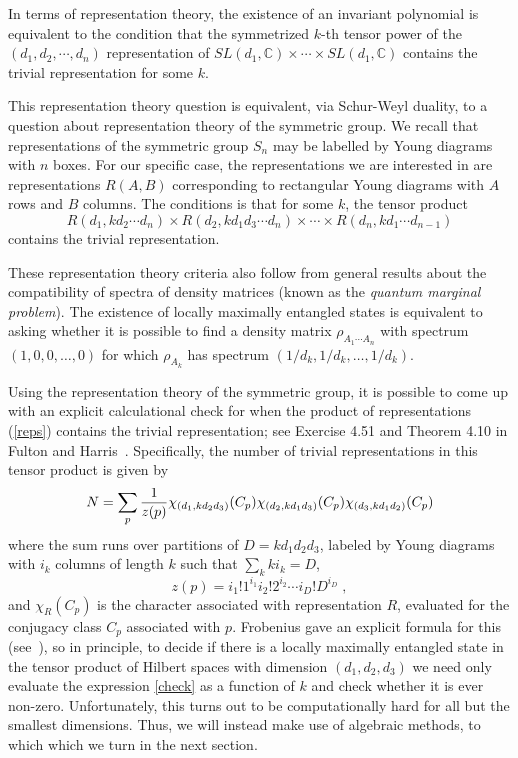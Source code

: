 \documentclass[12pt]{article}
\theoremstyle{definition}
\newcommand{\be}{\begin{equation}}
\newcommand{\ee}{\end{equation}}
\begin{document}
In terms of representation theory, the existence of an invariant polynomial is equivalent to the condition that the symmetrized $k$-th tensor power of the $(d_1,d_2,\cdots, d_n)$ representation of $SL(d_1, \mathbb{C}) \times \cdots \times SL(d_1, \mathbb{C})$ contains the trivial representation for some $k$.

This representation theory question is equivalent, via Schur-Weyl duality, to a question about representation theory of the symmetric group. We recall that representations of the symmetric group $S_n$ may be labelled by Young diagrams with $n$ boxes. For our specific case, the representations we are interested in are representations $R(A,B)$ corresponding to rectangular Young diagrams with $A$ rows and $B$ columns. The conditions is that for some $k$, the tensor product
\be
\label{reps}
R(d_1, k d_2 \cdots d_n) \times R(d_2, k d_1 d_3 \cdots d_n) \times \cdots \times R(d_n, k d_1 \cdots d_{n-1})
\ee
contains the trivial representation.

These representation theory criteria also follow from general results about the compatibility of spectra of density matrices (known as the {\it quantum marginal problem}). The existence of locally maximally entangled states is equivalent to asking whether it is possible to find a density matrix $\rho_{A_1 \cdots A_n}$ with spectrum $(1,0,0,\dots,0)$ for which $\rho_{A_k}$ has spectrum $(1/d_k,1/d_k, \dots, 1/d_k)$.

Using the representation theory of the symmetric group, it is possible to come up with an explicit calculational check for when the product of representations (\ref{reps}) contains the trivial representation; see Exercise 4.51 and Theorem 4.10 in Fulton and Harris~\cite{fh}. Specifically, the number of trivial representations in this tensor product is given by
\be
\label{check}
N = \sum_p {1 \over z(p)} \chi_{(d_1, k d_2 d_3)}(C_p) \chi_{(d_2, k d_1 d_3)}(C_p) \chi_{(d_3, k d_1 d_2)}(C_p)
\ee
where the sum runs over partitions of $D = k d_1 d_2 d_3$, labeled by Young diagrams with $i_k$ columns of length $k$  such that $\sum_k k i_k = D$,
\be
z(p) = i_1!1^{i_1} i_2! 2^{i_2} \cdots i_D! D^{i_D} \; ,
\ee
and $\chi_R(C_p)$ is the character associated with representation $R$, evaluated for the conjugacy class $C_p$ associated with $p$. Frobenius gave an explicit formula for this (see~\cite[4.10]{fh}), so in principle, to decide if there is a locally maximally entangled state in the tensor product of Hilbert spaces with dimension $(d_1,d_2,d_3)$ we need only evaluate the expression \eqref{check} as a function of $k$ and check whether it is ever non-zero. Unfortunately, this turns out to be computationally hard for all but the smallest dimensions. Thus, we will instead make use of algebraic methods, to which which we turn in the next section.
\end{document}
